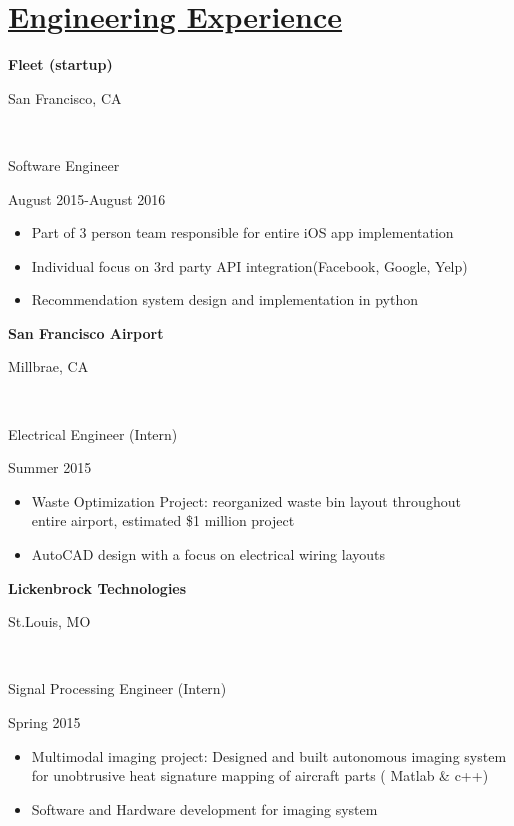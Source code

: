 \documentclass[12pt]{article}
\newcommand\textboxtwo[1]{%
  \parbox{.5\textwidth}{#1}%
}
\newcommand{\lreven}[2]{
	\textboxtwo{#1\hfill}\textboxtwo{\hfill #2}
}
\begin{document}
\section*{\underline{Engineering Experience}}
\lreven{\textbf{Fleet (startup)}}{San Francisco, CA}
\\\lreven{\quad Software Engineer }{August 2015-August 2016}
\begin{itemize}[topsep=0pt,itemsep=-1ex,partopsep=1ex,parsep=1ex]
	\item Part of 3 person team responsible for entire iOS app implementation
	\item Individual focus on 3rd party API integration(Facebook, Google, Yelp)
	\item Recommendation system design and implementation in python
\end{itemize} \vspace{2mm}
\lreven{\textbf{San Francisco Airport}}{ Millbrae, CA }\\
\lreven{\quad Electrical Engineer (Intern)}{Summer 2015}
\begin{itemize}[topsep=0pt,itemsep=-1ex,partopsep=1ex,parsep=1ex]
	\item   Waste Optimization Project: reorganized waste bin layout throughout  \\ \quad\hspace{20em} entire airport, estimated \$1 million project
	\item AutoCAD design with a focus on electrical wiring layouts
\end{itemize}\vspace{2mm}
\lreven{\textbf{Lickenbrock Technologies}}{St.Louis, MO}\\
\lreven{\quad Signal Processing Engineer (Intern)}{Spring 2015}
\begin{itemize}[topsep=0pt,itemsep=-1ex,partopsep=1ex,parsep=1ex]
	\item Multimodal imaging project: Designed and built autonomous imaging system\\ for unobtrusive  heat signature mapping of aircraft parts ( Matlab \& c++)
	\item Software and Hardware development for imaging system
\end{itemize}
\end{document}
